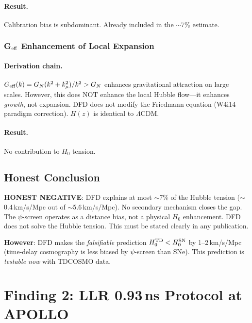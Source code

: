 \documentclass[11pt]{article}
\begin{document}
\paragraph{Result.} Calibration bias is subdominant. Already included in
the $\sim$7\% estimate.

\subsubsection{G$_{\rm eff}$ Enhancement of Local Expansion}

\paragraph{Derivation chain.}
$G_{\rm eff}(k) = G_N (k^2 + k_\mu^2)/k^2 > G_N$ enhances gravitational
attraction on large scales. However, this does NOT enhance the local
Hubble flow---it enhances \emph{growth}, not expansion. DFD does not
modify the Friedmann equation (W4i14 paradigm correction). $H(z)$
is identical to $\Lambda$CDM.

\paragraph{Result.} No contribution to $H_0$ tension.

\subsection{Honest Conclusion}

\begin{tcolorbox}[colback=red!5!white, colframe=red!70!black]
\textbf{HONEST NEGATIVE}: DFD explains at most $\sim$7\% of the Hubble
tension ($\sim$0.4\,km/s/Mpc out of $\sim$5.6\,km/s/Mpc). No secondary
mechanism closes the gap. The $\psi$-screen operates as a distance bias,
not a physical $H_0$ enhancement. DFD does not solve the Hubble tension.
This must be stated clearly in any publication.

\textbf{However}: DFD makes the \emph{falsifiable} prediction
$H_0^{\rm TD} < H_0^{\rm SN}$ by 1--2\,km/s/Mpc (time-delay
cosmography is less biased by $\psi$-screen than SNe). This prediction
is \emph{testable now} with TDCOSMO data.
\end{tcolorbox}

\section{Finding 2: LLR 0.93\,ns Protocol at APOLLO}
\end{document}
